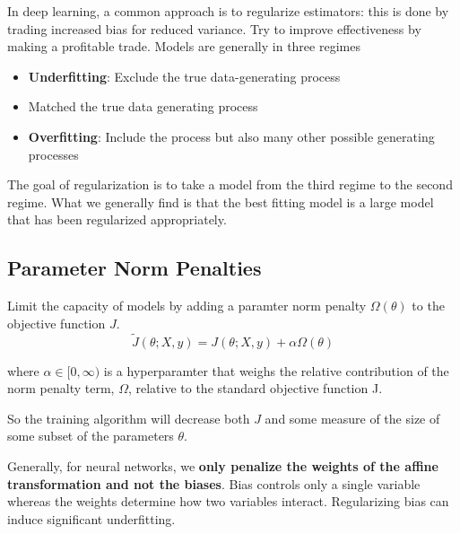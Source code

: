 \documentclass{article}
\begin{document}
In deep learning, a common approach is to regularize estimators: this is done by trading increased bias for reduced variance. Try to improve effectiveness by making a profitable trade. Models are generally in three regimes
\begin{itemize}
    \item \textbf{Underfitting}: Exclude the true data-generating process
    \item Matched the true data generating process
    \item \textbf{Overfitting}: Include the process but also many other possible generating processes
\end{itemize}
The goal of regularization is to take a model from the third regime to the second regime. What we generally find is that the best fitting model is a large model that has been regularized appropriately.

\subsection{Parameter Norm Penalties}

Limit the capacity of models by adding a paramter norm penalty $\Omega(\theta)$ to the objective function $J$. 
$$ \tilde{J}(\theta; X, y) = J( \theta; X, y) + \alpha\Omega(\theta) $$

where $ \alpha \in [0, \infty) $ is a hyperparamter that weighs the relative contribution of the norm penalty term, $\Omega$, relative to the standard objective function J.

So the training algorithm will decrease both $J$ and some measure of the size of some subset of the parameters $ \theta$.

Generally, for neural networks, we \textbf{only penalize the weights of the affine transformation and not the biases}. Bias controls only a single variable whereas the weights determine how two variables interact. Regularizing bias can induce significant underfitting.
\end{document}
